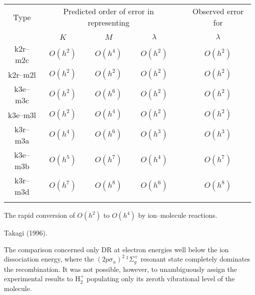 \documentclass{ws-rv9x6}
\begin{document}
\begin{table}[th]      %
\def\p{\phantom{0000}}
{\begin{tabular}{@{}cccccc@{}}
\toprule
Type &\multicolumn{3}{c}{Predicted order of error in representing} 
&{} &Observed error for\\[0.8ex]
\cline{2-4} \cline{6-6}\\[-2ex]
{} &$K$ &\phantom{000}$M$ &$\lambda$ &{} &$\lambda$\\
\colrule
k2r--m2c &$O(h^2)$ &\p$O(h^4)$ &$O(h^2)$ &{}
&$O(h^2)$\\[0.4ex]
k2r--m2l &$O(h^2)$ &\p$O(h^2)$ &$O(h^2)$ &{} &$O(h^2)$\\[0.4ex]
k3e--m3c &$O(h^2)$ &\p$O(h^6)$ &$O(h^2)$ &{} &$O(h^2)$\\[0.4ex]
k3e--m3l &$O(h^2)$ &\p$O(h^4)$ &$O(h^2)$ &{} &$O(h^2)$\\[0.4ex]
k3r--m3a &$O(h^4)$ &\p$O(h^6)$ &$O(h^3)$ &{} &$O(h^3)$\\[0.4ex]
k3e--m3b &$O(h^5)$ &\p$O(h^7)$ &$O(h^4)$ &{} &$O(h^7)$\\[0.4ex]
k3r--m3d &$O(h^7)$ &\p$O(h^8)$ &$O(h^6)$ &{} &$O(h^8)$\\
\botrule
\end{tabular}}
\begin{tabnote}[Note$:$]
The rapid conversion of $O(h^2)$ to $O(h^4)$ by ion--molecule reactions.
\end{tabnote}
\begin{tabnote}[Source$:$]
Takagi (1996).
\end{tabnote}
\end{table}

The comparison concerned only DR at electron energies well
below the ion dissociation energy, where the 
$(2p \sigma_u)^2\, ^1 \Sigma_g^+$ resonant state 
completely dominates the recombination. It was not possible, 
however, to unambiguously assign the experimental results to
H$_2^+$ populating only its zeroth vibrational level of the molecule.
\end{document}
